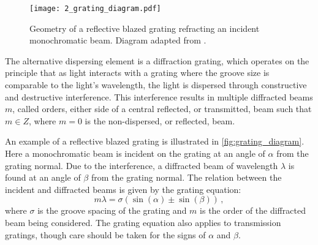 \begin{figure}[t]
    \centering
    \texttt{[image: 2\_grating\_diagram.pdf]}
    \caption{
        Geometry of a reflective blazed grating refracting an incident monochromatic beam.
        Diagram adapted from \cite{BirneyObsAstro}.
    }
    \label{fig:grating_diagram}
\end{figure}

The alternative dispersing element is a diffraction grating, which operates on the principle that as light interacts with a grating where the groove size is comparable to the light's wavelength, the light is dispersed through constructive and destructive interference.
This interference results in multiple diffracted beams $m$, called orders, either side of a central reflected, or transmitted, beam such that $m \in Z$, where $m = 0$ is the non-dispersed, or reflected, beam.

An example of a reflective blazed grating is illustrated in \autoref{fig:grating_diagram}.
Here a monochromatic beam is incident on the grating at an angle of $\alpha$ from the grating normal.
Due to the interference, a diffracted beam of wavelength $\lambda$ is found at an angle of $\beta$ from the grating normal.
The relation between the incident and diffracted beams is given by the grating equation:
\begin{equation} \label{eq:grating_equation}
    m\lambda = \sigma (\sin(\alpha) \pm \sin(\beta))\,,
\end{equation}
where $\sigma$ is the groove spacing of the grating and $m$ is the order of the diffracted beam being considered.
The grating equation also applies to transmission gratings, though care should be taken for the signs of $\alpha$ and $\beta$.


